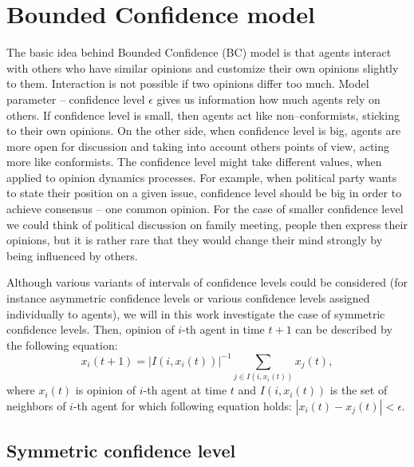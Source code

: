 \documentclass{article}
\begin{document}
\section{Bounded Confidence model}

The basic idea behind Bounded Confidence (BC) model is that agents interact with others who have similar opinions and customize their own opinions slightly to them. Interaction is not possible if two opinions differ too much. Model parameter -- confidence level $\epsilon$ gives us information how much agents rely on others. If confidence level is small, then agents act like non--conformists, sticking to their own opinions. On the other side, when confidence level is big, agents are more open for discussion and taking into account others points of view, acting more like conformists. The confidence level might take different values, when applied to opinion dynamics processes. For example, when political party wants to state their position on a given issue, confidence level should be big in order to achieve consensus -- one common opinion. For the case of smaller confidence level we could think of political discussion on family meeting, people then express their opinions, but it is rather rare that they would change their mind strongly by being influenced by others.
\indent

Although various variants of intervals of confidence levels could be considered (for instance asymmetric confidence levels \cite{bc} or  various confidence levels assigned individually to agents), we will in this work investigate the case of symmetric confidence levels. Then, opinion of $i$-th agent in time $t+1$ can be described by the following equation:
\begin{equation}
x_i(t+1) = \left| I(i, x_i(t)) \right|^{-1} \sum_{j \in I(i, x_i(t))} {x_j(t)},
\label{bceq}
\end{equation} 
where $x_i(t)$ is opinion of $i$-th agent at time $t$ and $I(i, x_i(t))$ is the set of neighbors of $i$-th agent for which following equation holds: $\left| x_i(t) - x_j(t) \right| < \epsilon$. 
	
\subsection{Symmetric confidence level}
\end{document}
